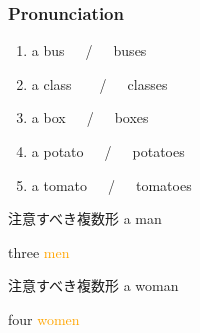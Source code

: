 \documentclass[aspectratio=169,xcolor={dvipsnames,table}]{beamer}
\newcommand{\myaudio}[1]{\href{#1}{\faVolumeUp}}
\begin{document}
\begin{frame}[plain]\frametitle{Pronunciation}

\begin{enumerate}
 \item a bus~~~\pause{}/~~~buses\pause
 \item a class~~~~\pause{}/~~~classes\pause
 \item a box~~~\pause{}/~~~boxes\pause
 \item a potato~~~\pause{}/~~~potatoes\pause
 \item a tomato~~~\pause{}/~~~tomatoes

 \end{enumerate}


\bigskip

\bigskip

\mbox{}\hfill\myaudio{./audio/005_singular_plural_07.mp3}
\end{frame}
\begin{frame}[plain]{注意すべき複数形}
\scalebox{5}{\ManFace}\hspace{15pt}
\pause
{\LARGE a man}
\pause

\bigskip

\bigskip

\scalebox{5}{\ManFace\hspace{5pt}\ManFace\hspace{5pt}\ManFace}\hspace{15pt}
\pause
{\LARGE three  \textcolor{orange}{men}}

\bigskip

\bigskip

\mbox{}\hfill\myaudio{./audio/005_singular_plural_08.mp3}
\end{frame}
\begin{frame}[plain]{注意すべき複数形}
\scalebox{5}{\WomanFace}\pause\hspace{15pt} {\LARGE a woman}
\pause

\bigskip

\bigskip

\scalebox{5}{\WomanFace \WomanFace \WomanFace \WomanFace} \hspace{25pt}
\pause
{\LARGE four  \textcolor{orange}{women}}

\bigskip

\bigskip

\mbox{}\hfill\myaudio{./audio/005_singular_plural_09.mp3}
\end{frame}
\end{document}
